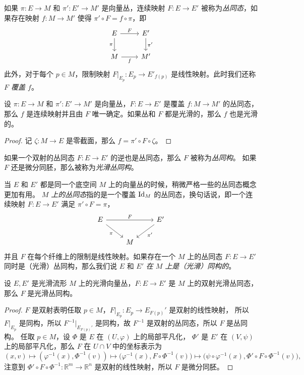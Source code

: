 如果 $\pi:E\to M$ 和 $\pi':E'\to M'$ 是向量丛，连续映射 $F:E\to E'$
被称为\emph{丛同态}，如果存在映射 $f:M\to M'$ 使得
$\pi'\circ F=f\circ\pi$，即
\[
  \begin{tikzcd}
    E\arrow[r,"F"]\arrow[d,"\pi"'] & E'\arrow[d,"\pi'"]\\
    M\arrow[r,"f"'] & M' 
  \end{tikzcd}  
\]
此外，对于每个 $p\in M$，限制映射 $F|_{E_p}:E_p\to E'_{f(p)}$
是线性映射。此时我们还称 \emph{$F$ 覆盖 $f$}。

\begin{proposition}
  设 $\pi:E\to M$ 和 $\pi':E'\to M'$ 是向量丛，$F:E\to E'$
  是覆盖 $f:M\to M'$ 的丛同态，那么 $f$ 是连续映射并且由 $F$
  唯一确定。如果丛和 $F$ 都是光滑的，那么 $f$ 也是光滑的。
\end{proposition}
\begin{proof}
  记 $\zeta:M\to E$ 是零截面，那么 $f=\pi'\circ F\circ\zeta$。
\end{proof}

如果一个双射的丛同态 $F:E\to E'$ 的逆也是丛同态，那么 $F$ 被称为\emph{丛同构}。
如果 $F$ 还是微分同胚，那么被称为\emph{光滑丛同构}。

当 $E$ 和 $E'$ 都是同一个底空间 $M$ 上的向量丛的时候，稍微严格一些的丛同态概念更加有用。
\emph{$M$ 上的丛同态}指的是一个覆盖 $\operatorname{Id}_M$ 的丛同态，换句话说，即一个连续映射
$F:E\to E'$ 满足 $\pi'\circ F=\pi$，
\[
  \begin{tikzcd}
    E\arrow[rr,"F"]\arrow[dr,"\pi"'] & & E'\arrow[dl,"\pi'"]\\
    & M & 
  \end{tikzcd}  
\]
并且 $F$ 在每个纤维上的限制是线性映射。如果存在一个 $M$ 上的丛同态
$F:E\to E'$ 同时是（光滑）丛同构，那么我们说 $E$ 和 $E'$ 
\emph{在 $M$ 上是（光滑）同构的}。

\begin{proposition}
  设 $E,E'$ 是光滑流形 $M$ 上的光滑向量丛，$F:E\to E'$ 是
  $M$ 上的双射光滑丛同态，那么 $F$ 是光滑丛同构。
\end{proposition}
\begin{proof}
  $F$ 是双射表明任取 $p\in M$，$F|_{E_p}:E_p\to E_{F(p)}'$ 是双射的线性映射，
  所以 $F|_{E_p}$ 是同构，所以 $F^{-1}|_{E_{F(p)}'}$ 是同构，故
  $F^{-1}$ 是双射的丛同态，所以 $F$ 是丛同构。
  任取 $p\in M$，设 $\varPhi$ 是 $E$ 在 $(U,\varphi)$ 上的局部平凡化，
  $\varPhi'$ 是 $E'$ 在 $(V,\psi)$ 上的局部平凡化，那么 
  $F$ 在 $U\cap V$ 中的坐标表示为
  \[
    (x,v)\mapsto (\varphi^{-1}(x),\varPhi^{-1}(v))\mapsto \bigl(\varphi^{-1}(x),F\circ\varPhi^{-1}(v)\bigr)  
    \mapsto \bigl(\psi\circ\varphi^{-1}(x),\varPhi'\circ F\circ\varPhi^{-1}(v)\bigr),
  \]
  注意到 $\varPhi'\circ F\circ\varPhi^{-1}:\mathbb{R}^m\to \mathbb{R}^{n}$
  是双射的线性映射，所以 $F$ 是微分同胚。
\end{proof}

